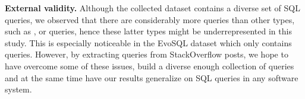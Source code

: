\noindent \textbf{External validity.} Although the collected dataset contains a diverse set of SQL queries, we observed that there are considerably more  queries than other types, such as ,  or  queries, hence these latter types might be underrepresented in this study. This is especially noticeable in the EvoSQL dataset which only contains  queries. However, by extracting queries from StackOverflow posts, we hope to have overcome some of these issues, build a diverse enough collection of queries and at the same time have our results generalize on SQL queries in any software system.
